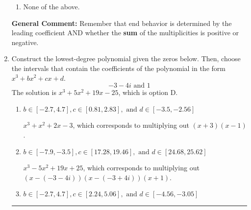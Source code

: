 \documentclass{extbook}[14pt]
\newcommand{\litem}[1]{\item #1

\rule{\textwidth}{0.4pt}}
\begin{document}
\begin{enumerate}
{\begin{enumerate}[label=\Alph*.]
\item None of the above.\end{enumerate}
\textbf{General Comment:} Remember that end behavior is determined by the leading coefficient AND whether the \textbf{sum} of the multiplicities is positive or negative.
}
\litem{
Construct the lowest-degree polynomial given the zeros below. Then, choose the intervals that contain the coefficients of the polynomial in the form $x^3+bx^2+cx+d$.
\[ -3 - 4 i \text{ and } 1 \]The solution is \( x^{3} +5 x^{2} +19 x -25 \), which is option D.\begin{enumerate}[label=\Alph*.]
\item \( b \in [-2.7, 4.7], c \in [0.81, 2.83], \text{ and } d \in [-3.5, -2.56] \)

$x^{3} + x^{2} +2 x -3$, which corresponds to multiplying out $(x + 3)(x -1)$.
\item \( b \in [-7.9, -3.5], c \in [17.28, 19.46], \text{ and } d \in [24.68, 25.62] \)

$x^{3} -5 x^{2} +19 x + 25$, which corresponds to multiplying out $(x-(-3 - 4 i))(x-(-3 + 4 i))(x + 1)$.
\item \( b \in [-2.7, 4.7], c \in [2.24, 5.06], \text{ and } d \in [-4.56, -3.05] \)


\end{enumerate}}
\end{enumerate}
\end{document}
